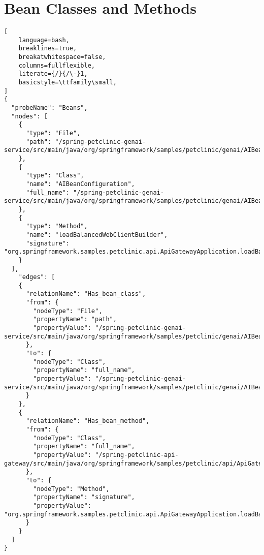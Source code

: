 \section{Bean Classes and Methods}\label{appendix_sec:bean_classes_methods}
\begin{lstlisting}[
    language=bash,
    breaklines=true,
    breakatwhitespace=false,
    columns=fullflexible,
    literate={/}{/\-}1,
    basicstyle=\ttfamily\small,
]
{
  "probeName": "Beans",
  "nodes": [
    {
      "type": "File",
      "path": "/spring-petclinic-genai-service/src/main/java/org/springframework/samples/petclinic/genai/AIBeanConfiguration.java"
    },
    {
      "type": "Class",
      "name": "AIBeanConfiguration",
      "full_name": "/spring-petclinic-genai-service/src/main/java/org/springframework/samples/petclinic/genai/AIBeanConfiguration.java:AIBeanConfiguration"
    },
    {
      "type": "Method",
      "name": "loadBalancedWebClientBuilder",
      "signature": "org.springframework.samples.petclinic.api.ApiGatewayApplication.loadBalancedWebClientBuilder()"
    }
  ],
    "edges": [
    {
      "relationName": "Has_bean_class",
      "from": {
        "nodeType": "File",
        "propertyName": "path",
        "propertyValue": "/spring-petclinic-genai-service/src/main/java/org/springframework/samples/petclinic/genai/AIBeanConfiguration.java"
      },
      "to": {
        "nodeType": "Class",
        "propertyName": "full_name",
        "propertyValue": "/spring-petclinic-genai-service/src/main/java/org/springframework/samples/petclinic/genai/AIBeanConfiguration.java:AIBeanConfiguration"
      }
    },
    {
      "relationName": "Has_bean_method",
      "from": {
        "nodeType": "Class",
        "propertyName": "full_name",
        "propertyValue": "/spring-petclinic-api-gateway/src/main/java/org/springframework/samples/petclinic/api/ApiGatewayApplication.java:ApiGatewayApplication"
      },
      "to": {
        "nodeType": "Method",
        "propertyName": "signature",
        "propertyValue": "org.springframework.samples.petclinic.api.ApiGatewayApplication.loadBalancedWebClientBuilder()"
      }
    }
  ]
}
\end{lstlisting}

